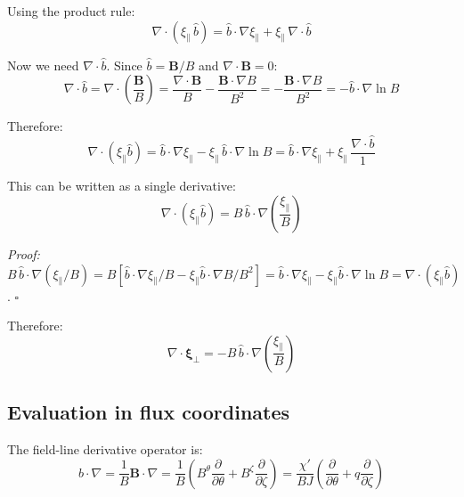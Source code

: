 \documentclass[12pt,a4paper]{article}
\newcommand{\bxi}{\boldsymbol{\xi}}
\begin{document}
Using the product rule:
\begin{equation}
    \nabla\cdot(\xi_\parallel\,\hat{b}) = \hat{b}\cdot\nabla\xi_\parallel + \xi_\parallel\,\nabla\cdot\hat{b}
\end{equation}

Now we need $\nabla\cdot\hat{b}$. Since $\hat{b} = \mathbf{B}/B$ and $\nabla\cdot\mathbf{B} = 0$:
\begin{equation}
    \nabla\cdot\hat{b} = \nabla\cdot\!\left(\frac{\mathbf{B}}{B}\right)
    = \frac{\nabla\cdot\mathbf{B}}{B} - \frac{\mathbf{B}\cdot\nabla B}{B^2}
    = -\frac{\mathbf{B}\cdot\nabla B}{B^2} = -\hat{b}\cdot\nabla\ln B
    \label{eq:divbhat}
\end{equation}

Therefore:
\begin{equation}
    \nabla\cdot(\xi_\parallel\hat{b}) = \hat{b}\cdot\nabla\xi_\parallel - \xi_\parallel\,\hat{b}\cdot\nabla\ln B
    = \hat{b}\cdot\nabla\xi_\parallel + \xi_\parallel\,\frac{\nabla\cdot\hat{b}}{1}
\end{equation}

This can be written as a single derivative:
\begin{equation}
    \nabla\cdot(\xi_\parallel\hat{b}) = B\,\hat{b}\cdot\nabla\!\left(\frac{\xi_\parallel}{B}\right)
    \label{eq:divbhat_compact}
\end{equation}

\textit{Proof:} $B\,\hat{b}\cdot\nabla(\xi_\parallel/B) = B[\hat{b}\cdot\nabla\xi_\parallel/B - \xi_\parallel\hat{b}\cdot\nabla B/B^2] = \hat{b}\cdot\nabla\xi_\parallel - \xi_\parallel\hat{b}\cdot\nabla\ln B = \nabla\cdot(\xi_\parallel\hat{b})$. $\square$

Therefore:
\begin{equation}
    \boxed{\nabla\cdot\bxi_\perp = -B\,\hat{b}\cdot\nabla\!\left(\frac{\xi_\parallel}{B}\right)}
    \label{eq:divxiperp_final}
\end{equation}

\subsection{Evaluation in flux coordinates}

The field-line derivative operator is:
\begin{equation}
    \hat{b}\cdot\nabla = \frac{1}{B}\mathbf{B}\cdot\nabla
    = \frac{1}{B}\!\left(B^\theta\frac{\partial}{\partial\theta} + B^\zeta\frac{\partial}{\partial\zeta}\right)
    = \frac{\chi'}{BJ}\!\left(\frac{\partial}{\partial\theta} + q\frac{\partial}{\partial\zeta}\right)
    \label{eq:bdotgrad}
\end{equation}
\end{document}
